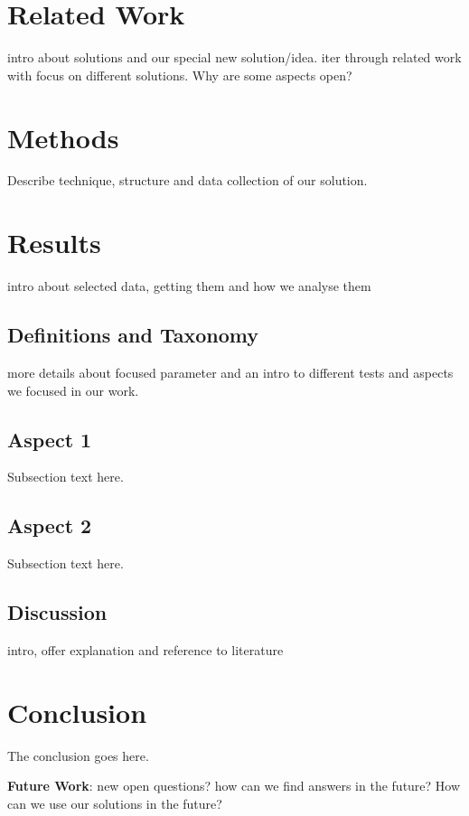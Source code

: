 \section{Related Work}\label{related-work}

intro about solutions and our special new solution/idea. iter through
related work with focus on different solutions. Why are some aspects
open?

\section{Methods}\label{methods}

Describe technique, structure and data collection of our solution.

\section{Results}\label{results}

intro about selected data, getting them and how we analyse them

\subsection{Definitions and Taxonomy}\label{definitions-and-taxonomy}

more details about focused parameter and an intro to different tests and
aspects we focused in our work.

\subsection{Aspect 1}\label{aspect-1}

Subsection text here.

\subsection{Aspect 2}\label{aspect-2}

Subsection text here.

\subsection{Discussion}\label{discussion}

intro, offer explanation and reference to literature

\section{Conclusion}\label{conclusion}

The conclusion goes here.

\textbf{Future Work}: new open questions? how can we find answers in the
future? How can we use our solutions in the future?
